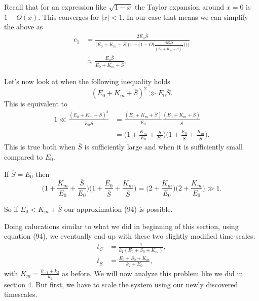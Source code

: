 \documentclass[12pt]{article}
\begin{document}
Recall that for an expression like $\sqrt{1-x}$ the Taylor expansion
around $x=0$ is $1 - O(x)$. This converges for $|x| < 1$. In our case
that means we can simplify the above as
\begin{align}
   c_1 &= \frac{2 E_0 \overline{S}}
              {\Big(E_0 + K_m + \overline{S}\Big)
               \Big(1 + \Big(1 -
                O\Big(\frac{4 E_0 \overline{S}}
                           {(E_0 + K_m + \overline{S})^2}\Big)\Big)\Big)} \\
      &\approx \frac{E_0 \overline{S}}
                    {E_0 + K_m + \overline{S}}.
\end{align}

Let's now look at when the following inequality holds
\begin{equation}
(E_0 + K_m + \overline{S})^2 \gg E_0 \overline{S}.
\end{equation}
This is equivalent to
\begin{align}
1 \ll
  \frac{(E_0 + K_m + \overline{S})^2}
           {E_0 \overline{S}} &= 
\frac{(E_0 + K_m + \overline{S})}
      {E_0} \frac{(E_0 + K_m + \overline{S})}{\overline{S}} \\
&= \Big(1 + \frac{K_m}{E_0} + \frac{\overline{S}}{E_0}\Big)
   \Big(1 + \frac{E_0}{\overline{S}} + \frac{K_m}{\overline{S}}\Big).
\end{align}
This is true both when $\overline{S}$ is sufficiently large and when
it is sufficiently small compared to $E_0$.

If $\overline{S} = E_0$ then
\begin{equation}
\Big(1 + \frac{K_m}{E_0} + \frac{\overline{S}}{E_0}\Big)\Big(1 + \frac{E_0}{\overline{S}} + \frac{K_m}{\overline{S}}\Big) = \Big(2 + \frac{K_m}{E_0}\Big) \Big(2 + \frac{K_m}{E_0}\Big) \gg 1.
\end{equation}

So if $E_0 < K_m + \overline{S}$ our approximation (94) is possible.

Doing calucations similar to what we did in beginning of this section,
using equation (94), we eventually end up with these two slightly
modified time-scales:
\begin{align}
t_C &= \frac{1}{k_1(E_0+S_0+K_m)}, \\
t_{\overline{S}} &= \frac{E_0+S_0+K_m}{k_2+E_0},
\end{align}
with $K_m = \frac{k_{-1}+k_2}{k_1}$ as before. We will now analyze
this problem like we did in section 4. But first, we have to
scale the system using our newly discovered timescales.
\end{document}
